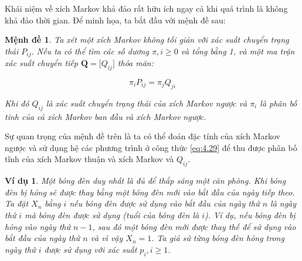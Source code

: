 \documentclass[14pt, a4paper]{article}
\numberwithin{equation}{section}
\numberwithin{figure}{section}
\newtheorem{md}{Mệnh đề}
\theoremstyle{sltheorem}
\newtheorem{vd}{Ví dụ}
\theoremstyle{soltheorem}
\numberwithin{dl}{section}
\numberwithin{md}{section}
\numberwithin{vd}{section}
\begin{document}
    Khái niệm về xích Markov khả đảo rất hữu ích ngay cả khi quá trình là không khả đảo thời gian.
    Để minh họa, ta bắt đầu với mệnh đề sau:

    \begin{md} \label{md:4.7}
        Ta xét một xích Markov không tối giản với xác suất chuyển trạng thái $P_{ij}$.
        Nếu ta có thể tìm các số dương $\pi, i \geq 0$ và tổng bằng 1, và một ma trận xác suất chuyển tiếp $\mathbf{Q} = \lbrack Q_{ij} \rbrack$ thỏa mãn:

        \begin{equation} \label{eq:4.29}
            \pi_i P_{ij} = \pi_j Q_{ji}
        \end{equation}

        Khi đó $Q_{ij}$ là xác suất chuyển trạng thái của xích Markov ngược và $\pi_i$ là phân bố tĩnh của cả xích Markov ban đầu và xích Markov ngược.
    \end{md}

    Sự quan trọng của mệnh đề trên là ta có thể đoán đặc tính của xích Markov ngược và sử dụng hệ các phương trình ở công thức \ref{eq:4.29} để thu được phân bố tĩnh của xích Markov thuận và xích Markov và $Q_{ij}$.

    \begin{vd}
        Một bóng đèn duy nhất là đủ để thắp sáng một căn phòng.
        Khi bóng đèn bị hỏng sẽ được thay bằng một bóng đèn mới vào bắt đầu của ngày tiếp theo.
        Ta đặt $X_n$ bằng $i$ nếu bóng đèn được sử dụng vào bắt đầu của ngày thứ $n$ là ngày thứ $i$ mà bóng đèn được sử dụng (tuổi của bóng đèn là $i$).
        Ví dụ, nếu bóng đèn bị hỏng vào ngày thứ $n-1$, sau đó một bóng đèn mới được thay thế để sử dụng vào bắt đầu của ngày thứ $n$ và vì vậy $X_n = 1$.
        Ta giả sử từng bóng đèn hỏng trong ngày thứ $i$ được sử dụng với xác suất $p_i, i \geq 1$.
    \end{vd}
\end{document}
